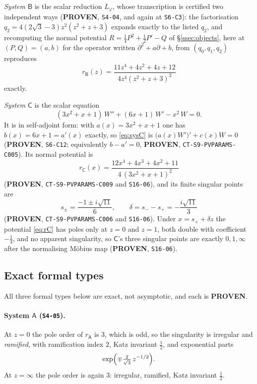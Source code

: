 \emph{System $\mathsf B$} is the scalar reduction $L_\varphi$, whose
transcription is certified two independent ways (\textbf{PROVEN},
\texttt{S4-04}, and again at \texttt{S6-C3}): the factorisation
$q_2=4(2\sqrt3-3)z^2(z^2+z+3)$ expands exactly to the listed $q_2$, and
recomputing the normal potential $R=\tfrac14P^2+\tfrac12P'-Q$ of
\S\ref{ssec:objects}, here at $(P,Q)=(a,b)$ for the operator written
$\partial^2+a\partial+b$, from $(q_0,q_1,q_2)$ reproduces
\begin{equation}\label{eq:rB}
  r_{\mathsf B}(z)=\frac{11z^4+4z^2+4z+12}{4z^4(z^2+z+3)^2}
\end{equation}
exactly.

\emph{System $\mathsf C$} is the scalar equation
\begin{equation}\label{eq:sysC}
  (3x^2+x+1)\,W''+(6x+1)\,W'-x^2\,W=0 .
\end{equation}
It is in self-adjoint form: with $a(x)=3x^2+x+1$ one has $b(x)=6x+1=a'(x)$
exactly, so \eqref{eq:sysC} is $\bigl(a(x)W'\bigr)'+c(x)W=0$
(\textbf{PROVEN}, \texttt{S6-C12}; equivalently $b-a'=0$, \textbf{PROVEN},
\texttt{CT-S9-PVPARAMS-C005}). Its normal potential is
\begin{equation}\label{eq:rC}
  r_{\mathsf C}(x)=\frac{12x^4+4x^3+4x^2+11}{4\,(3x^2+x+1)^2}
\end{equation}
(\textbf{PROVEN}, \texttt{CT-S9-PVPARAMS-C009} and \texttt{S16-06}), and its
finite singular points are
\begin{equation}\label{eq:spm}
  s_\pm=\frac{-1\pm i\sqrt{11}}{6},
  \qquad \delta=s_--s_+=-\frac{i\sqrt{11}}{3}
\end{equation}
(\textbf{PROVEN}, \texttt{CT-S9-PVPARAMS-C006} and \texttt{S16-06}). Under
$x=s_++\delta z$ the potential \eqref{eq:rC} has poles only at $z=0$ and $z=1$,
both double with coefficient $-\tfrac14$, and no apparent singularity, so
$\mathsf C$'s three singular points are exactly $0,1,\infty$ after the
normalising M\"obius map (\textbf{PROVEN}, \texttt{S16-06}).

\subsection{Exact formal types}\label{ssec:formaltypes}

All three formal types below are exact, not asymptotic, and each is
\textbf{PROVEN}.

\paragraph{System $\mathsf A$ (\texttt{S4-05}).} At $z=0$ the pole order of
$r_{\mathsf A}$ is $3$, which is odd, so the singularity is irregular and
\emph{ramified}, with ramification index $2$, Katz invariant $\tfrac12$, and
exponential parts
\[
  \exp\Bigl(\mp\tfrac{2}{\sqrt3}\,z^{-1/2}\Bigr).
\]
At $z=\infty$ the pole order is again $3$: irregular, ramified, Katz invariant
$\tfrac12$.

